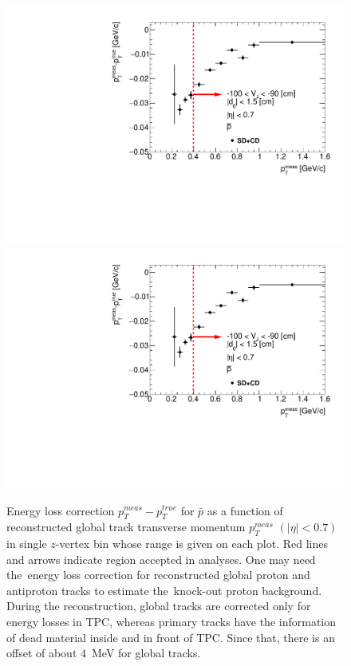 \begin{figure}[H]
\caption[Energy loss correction for $\bar{p}$ as a function of reconstructed global track transverse momentum $p_T^{meas}$.]{Energy loss correction $p_T^{meas}-p_T^{true}$ for $\bar{p}$ as a function of reconstructed global track transverse momentum $p_T^{meas}$ $\left(|\eta|<0.7\right)$ in single $z$-vertex bin whose range is given on each plot. Red lines and arrows indicate region accepted in analyses. One may need the~energy loss correction for reconstructed global proton and antiproton tracks to estimate the~knock-out proton background. During the reconstruction, global tracks are corrected only for energy losses in TPC, whereas primary tracks have the information of dead material inside and in front of TPC. Since that, there is an offset of about $4$~MeV for global tracks.}\label{fig:energyLossPrimaryP_barGlobal}
\parbox{0.329\textwidth}{
  \includegraphics[width=\linewidth,page=3]{graphics/energyLoss/energyLoss3DGlobal_OnePrtAlso.pdf}\\
  \includegraphics[width=\linewidth,page=6]{graphics/energyLoss/energyLoss3DGlobal_OnePrtAlso.pdf}\\
}
\end{figure}
